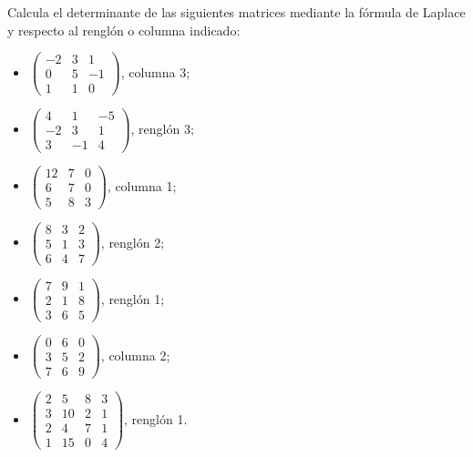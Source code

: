 \documentclass[8pt,a4paper]{article}
\begin{document}
\begin{enumerate}
	Calcula el determinante de las siguientes matrices mediante la fórmula de Laplace y respecto al renglón o columna indicado:
	\begin{multicols}{2}
		\begin{itemize}
			\item $\displaystyle \begin{pmatrix} -2 & 3 & 1 \\ 0 & 5 & -1 \\ 1 & 1 & 0 \end{pmatrix}$, columna 3;
			\item $\displaystyle \begin{pmatrix} 4 & 1 & -5 \\ -2 & 3 & 1 \\ 3 & -1 & 4 \end{pmatrix}$, renglón 3;
			\item $\displaystyle \begin{pmatrix} 12 & 7 & 0 \\ 6 & 7 & 0 \\ 5 & 8 & 3 \end{pmatrix}$, columna 1;
			\item $\displaystyle \begin{pmatrix} 8 & 3 & 2 \\ 5 & 1 & 3 \\ 6 & 4 & 7 \end{pmatrix}$, renglón 2;
			\item $\displaystyle \begin{pmatrix} 7 & 9 & 1 \\ 2 & 1 & 8 \\ 3 & 6 & 5 \end{pmatrix}$, renglón 1;
			\item $\displaystyle \begin{pmatrix} 0 & 6 & 0 \\ 3 & 5 & 2 \\ 7 & 6 & 9 \end{pmatrix}$, columna 2;
			\item $\displaystyle \begin{pmatrix} 2 & 5 & 8 & 3 \\ 3 & 10 & 2 & 1 
					\\ 2 & 4 & 7 & 1 \\ 1 & 15 & 0 & 4 \end{pmatrix}$, renglón 1.
		\end{itemize}
	\end{multicols}


\end{enumerate}
\end{document}
